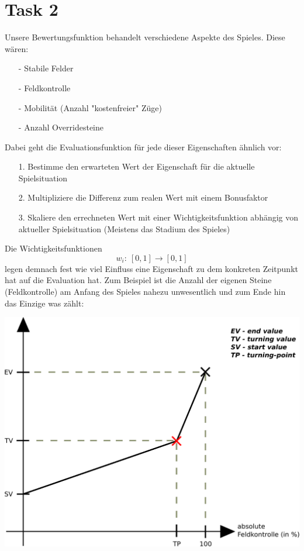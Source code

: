 \section{Task 2}
Unsere Bewertungsfunktion behandelt verschiedene Aspekte des Spieles. Diese wären:
\begin{enumerate}
\item[-] Stabile Felder
\item[-] Feldkontrolle
\item[-] Mobilität (Anzahl "kostenfreier" Züge)
\item[-] Anzahl Overridesteine
\end{enumerate}
Dabei geht die Evaluationsfunktion für jede dieser Eigenschaften ähnlich vor: 
\begin{enumerate}
\item[1.] Bestimme den erwarteten Wert der Eigenschaft für die aktuelle Spielsituation
\item[2.] Multipliziere die Differenz zum realen Wert mit einem Bonusfaktor
\item[3.] Skaliere den errechneten Wert mit einer Wichtigkeitsfunktion abhängig von aktueller Spielsituation (Meistens das Stadium des Spieles)
\end{enumerate}
Die Wichtigkeitsfunktionen $$w_i:\ [0,1] \rightarrow [0,1]$$ legen demnach fest wie viel Einfluss eine Eigenschaft zu dem konkreten Zeitpunkt hat auf die Evaluation hat. Zum Beispiel ist die Anzahl der eigenen Steine (Feldkontrolle) am Anfang des Spieles nahezu unwesentlich und zum Ende hin das Einzige was zählt:
\begin{center}
\includegraphics[scale=0.15]{ImportanceFunctionGraph.pdf}
\end{center}
